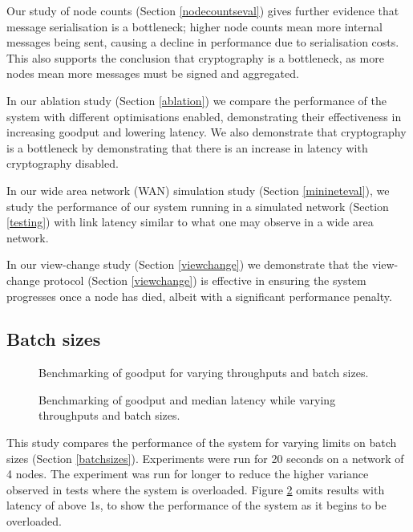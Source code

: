 Our study of node counts (Section \ref{nodecountseval}) gives further evidence that message serialisation is a bottleneck; higher node counts mean more internal messages being sent, causing a decline in performance due to serialisation costs. This also supports the conclusion that cryptography is a bottleneck, as more nodes mean more messages must be signed and aggregated.

In our ablation study (Section \ref{ablation}) we compare the performance of the system with different optimisations enabled, demonstrating their effectiveness in increasing goodput and lowering latency. We also demonstrate that cryptography is a bottleneck by demonstrating that there is an increase in latency with cryptography disabled.

In our wide area network (WAN) simulation study (Section \ref{minineteval}), we study the performance of our system running in a simulated network (Section \ref{testing}) with link latency similar to what one may observe in a wide area network.

In our view-change study (Section \ref{viewchange}) we demonstrate that the view-change protocol (Section \ref{viewchange}) is effective in ensuring the system progresses once a node has died, albeit with a significant performance penalty.

\subsection{Batch sizes} \label{batchsizeseval}

\begin{figure}[h!]
\centering
\resizebox{.6\textwidth}{!}{}
\caption{Benchmarking of goodput for varying throughputs and batch sizes.}
\label{throughputgoodputbatch}
\end{figure}

\begin{figure}[h!]
\centering
\resizebox{.6\textwidth}{!}{}
\caption{Benchmarking of goodput and median latency while varying throughputs and batch sizes.}
\label{goodputlatencybatch}
\end{figure}

This study compares the performance of the system for varying limits on batch sizes (Section \ref{batchsizes}). Experiments were run for 20 seconds on a network of 4 nodes. The experiment was run for longer to reduce the higher variance observed in tests where the system is overloaded. Figure \ref{goodputlatencybatch} omits results with latency of above 1s, to show the performance of the system as it begins to be overloaded.

